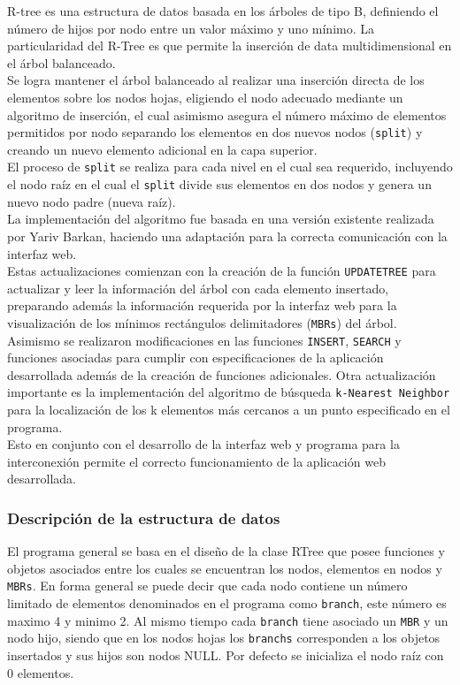 \documentclass[a4paper]{article}
\begin{document}
R-tree es una estructura de datos basada en los árboles de tipo B, definiendo el número de hijos por nodo entre un valor máximo y uno mínimo. La particularidad del R-Tree es que permite la inserción de data multidimensional en el árbol balanceado.\\

Se logra mantener el árbol balanceado al realizar una inserción directa de los elementos sobre los nodos hojas, eligiendo el nodo adecuado mediante un algoritmo de inserción, el cual asimismo asegura el número máximo de elementos permitidos por nodo separando los elementos en dos nuevos nodos (\texttt{split}) y creando un nuevo elemento adicional en la capa superior.\\

El proceso de \texttt{split} se realiza para cada nivel en el cual sea requerido, incluyendo el nodo raíz en el cual el \texttt{split} divide sus elementos en dos nodos y genera un nuevo nodo padre (nueva raíz).\\
La implementación del algoritmo fue basada en una versión existente realizada por Yariv Barkan\cite{r-tree}, haciendo una adaptación para la correcta comunicación con la interfaz web.\\ 

Estas actualizaciones comienzan con la creación de la función \texttt{UPDATETREE} para actualizar y leer la información del árbol con cada elemento insertado, preparando además la información requerida por la interfaz web para la visualización de los mínimos rectángulos delimitadores (\texttt{MBRs}) del árbol.\\

Asimismo se realizaron modificaciones en las funciones \texttt{INSERT}, \texttt{SEARCH} y funciones asociadas para cumplir con especificaciones de la aplicación desarrollada además de la creación de funciones adicionales. Otra actualización importante es la implementación del algoritmo de búsqueda \texttt{k-Nearest Neighbor} para la localización de los k elementos más cercanos a un punto especificado en el programa.\\

Esto en conjunto con el desarrollo de la interfaz web y programa para la interconexión permite el correcto funcionamiento de la aplicación web desarrollada.

\subsubsection{Descripción de la estructura de datos} %
El programa general se basa en el diseño de la clase RTree que posee funciones y objetos asociados entre los cuales se encuentran los nodos, elementos en nodos y \texttt{MBRs}. En forma general se puede decir que cada nodo contiene un número limitado de elementos denominados en el programa como \texttt{branch}, este número es maximo 4 y minimo 2. Al mismo tiempo cada \texttt{branch} tiene asociado un \texttt{MBR} y un nodo hijo, siendo que en los nodos hojas los \texttt{branchs} corresponden a los objetos insertados y sus hijos son nodos NULL. Por defecto se inicializa el nodo raíz con 0 elementos.\\
\end{document}
